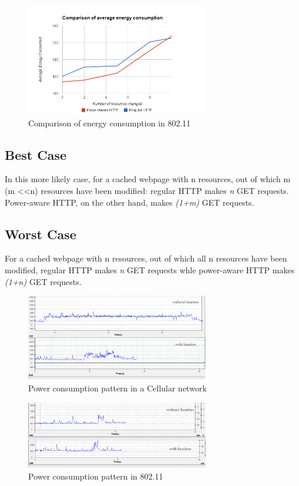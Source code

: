 \documentclass{sigplanconf}
\begin{document}
\begin{figure}[ht!]
\centering
\includegraphics[width=80mm]{avg_energy_wifi1.png}
\caption{Comparison of energy consumption in 802.11}
\label{fig:sp_gd_mnist}
\end{figure}


\subsection{Best Case}

In this more likely case, for a cached webpage with n resources, out of which m (m \textless \textless n) resources have been modified: regular HTTP makes {\it n} GET requests. Power-aware HTTP, on the other hand, makes {\it (1+m)} GET requests.

\subsection{Worst Case}

For a cached webpage with n resources, out of which all n resources have been modified, regular HTTP makes {\it n} GET requests whle power-aware HTTP makes {\it (1+n)} GET requests.

\begin{figure}[ht!]
\centering
\includegraphics[width=80mm]{Cellular_combined.png}
\caption{Power consumption pattern in a Cellular network }
\label{fig:sp_gd_mnist}
\end{figure}

\begin{figure}[ht!]	
\centering
\includegraphics[width=80mm]{Wifi_combined.png}
\caption{Power consumption pattern in 802.11}
\label{fig:sp_gd_mnist}
\end{figure}
\end{document}
